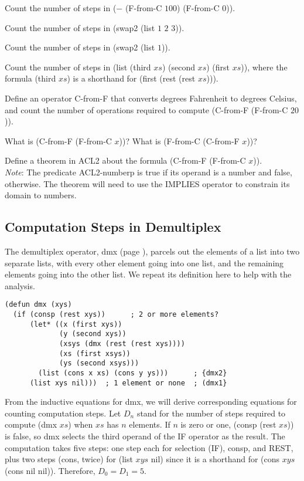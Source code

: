 \begin{ExerciseList}

\Exercise
Count the number of steps in ($-$ (F-from-C $100$) (F-from-C $0$)).

\Exercise
Count the number of steps in (swap2 (list $1$ $2$ $3$)).

\Exercise
Count the number of steps in (swap2 (list $1$)).

\Exercise
Count the number of steps in
(list (third $xs$) (second $xs$) (first $xs$)),
where the formula (third $xs$) is a shorthand for
(first (rest (rest $xs$))).

\Exercise
Define an operator C-from-F that converts degrees Fahrenheit
to degrees Celsius, and count the number of operations
required to compute (C-from-F (F-from-C $20$)).

\Exercise
What is (C-from-F (F-from-C $x$))?
What is (F-from-C (C-from-F $x$))?

\Exercise
Define a theorem in ACL2 about the formula (C-from-F (F-from-C $x$)). \\
\emph{Note}: The predicate ACL2-numberp is true if its operand is a number
and false, otherwise.
The theorem will need to use the IMPLIES operator to constrain its domain
to numbers.

\end{ExerciseList}

\subsection{Computation Steps in Demultiplex}
\label{subsec:dmx-steps}

The demultiplex operator, dmx (page \pageref{dmx-defun}), parcels out the elements of a list
into two separate lists, with every other element going into one list,
and the remaining elements going into the other list.
We repeat its definition here to help with the analysis.

\label{defun:dmx-copy}
\begin{Verbatim}
(defun dmx (xys)
  (if (consp (rest xys))      ; 2 or more elements?
      (let* ((x (first xys))
             (y (second xys))
             (xsys (dmx (rest (rest xys))))
             (xs (first xsys))
             (ys (second xsys)))
        (list (cons x xs) (cons y ys)))      ; {dmx2}
      (list xys nil)))  ; 1 element or none  ; (dmx1}
\end{Verbatim}

From the inductive equations for dmx,
we will derive corresponding equations for counting computation steps.
Let $D_n$ stand for the number of steps required
to compute (dmx $xs$) when $xs$ has $n$ elements.
If $n$ is zero or one, (consp (rest $xs$)) is false,
so dmx selects the third operand of the IF operator as the result.
The computation takes five steps: one step each for selection (IF),
consp, and REST, plus two steps (cons, twice) for (list $xys$ nil)
since it is a shorthand for (cons $xys$ (cons nil nil)).
Therefore, $D_0 = D_1 = 5$.

